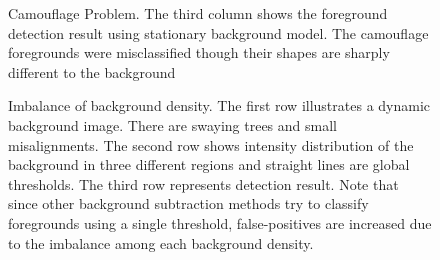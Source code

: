\documentclass[conference]{IEEEtran}
\begin{document}
\begin{figure}[!t]
  \centering
  \label{fig:10}
  \hfill
  \hfill
  \caption{Camouflage Problem. The third column shows the foreground detection result using stationary background model. The camouflage foregrounds were misclassified though their shapes are sharply different to the background}
\end{figure}

\begin{figure}[!t]
  \centering
  \label{fig:20}
  \hfill
  \caption{Imbalance of background density. The first row illustrates a dynamic background image. There are swaying trees and small misalignments. The second row shows intensity distribution of the background in three different regions and straight lines are global thresholds. The third row represents detection result. Note that since other background subtraction methods try to classify foregrounds using a single threshold, false-positives are increased due to the imbalance among each background density.}
\end{figure}
\end{document}
